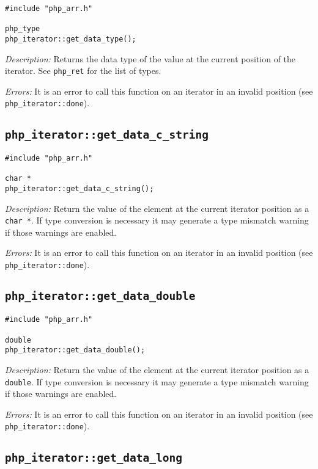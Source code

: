 \documentclass[11pt,titlepage]{article}
\begin{document}
\begin{verbatim}
#include "php_arr.h"

php_type 
php_iterator::get_data_type();
\end{verbatim}

\emph{Description:} Returns the data type of the value at the current position of the iterator. See \verb|php_ret| for the list of types.

\emph{Errors:} It is an error to call this function on an iterator in an invalid position (see \verb|php_iterator::done|).


\subsection{\texttt{php\_iterator::get\_data\_c\_string}}

\begin{verbatim}
#include "php_arr.h"

char *
php_iterator::get_data_c_string();
\end{verbatim}

\emph{Description:} Return the value of the element at the current iterator position as a \verb|char *|. If type conversion is necessary it may generate a type mismatch warning if those warnings are enabled.

\emph{Errors:} It is an error to call this function on an iterator in an invalid position (see \verb|php_iterator::done|).


\subsection{\texttt{php\_iterator::get\_data\_double}}

\begin{verbatim}
#include "php_arr.h"

double 
php_iterator::get_data_double();
\end{verbatim}

\emph{Description:} Return the value of the element at the current iterator position as a \verb|double|. If type conversion is necessary it may generate a type mismatch warning if those warnings are enabled.

\emph{Errors:} It is an error to call this function on an iterator in an invalid position (see \verb|php_iterator::done|).


\subsection{\texttt{php\_iterator::get\_data\_long}}
\end{document}
